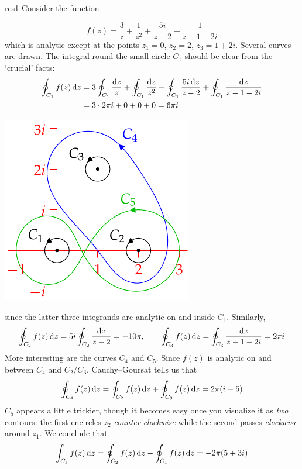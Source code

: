 \begin{example}{}{res1}
Consider the function\par
\begin{minipage}[t]{0.67\linewidth}\vspace{-10pt}
\[f(z)=\frac 3{z}+\frac 1{z^2}+\frac{5i}{z-2}+\frac 1{z-1-2i}\]
which is analytic except at the points $z_1=0$, $z_2=2$, $z_3=1+2i$.\smallbreak
Several curves are drawn. The integral round the small circle $C_1$ should be clear from the `crucial' facts:
\begin{align*}
\oint_{C_1}f(z)\,{\mathrm{d} z}&=3\oint_{C_1}\frac{{\mathrm{d} z}}z+\oint_{C_1}\frac{{\mathrm{d} z}}{z^2}+\oint_{C_1}\frac{5i\,{\mathrm{d} z}}{z-2}+\oint_{C_1}\frac{{\mathrm{d} z}}{z-1-2i}\\
&=3\cdot 2\pi i+0+0+0 =6\pi i
\end{align*}
\end{minipage}\begin{minipage}[t]{0.33\linewidth}\vspace{-15pt}
\flushright\includegraphics{res1}
\end{minipage}\medbreak
since the latter three integrands are analytic on and inside $C_1$. Similarly,
\begin{gather*}
\oint_{C_2}f(z)\,{\mathrm{d} z}=5i\oint_{C_2}\frac{{\mathrm{d} z}}{z-2}=-10\pi,\qquad
\oint_{C_3}f(z)\,{\mathrm{d} z} = \oint_{C_3}\frac{{\mathrm{d} z}}{z-1-2i}=2\pi i
\end{gather*}
More interesting are the curves $C_4$ and $C_5$. Since $f(z)$ is analytic on and between $C_4$ and $C_2/C_3$, Cauchy--Goursat tells us that
\[\oint_{C_4}f(z)\,{\mathrm{d} z}=\oint_{C_2}f(z)\,{\mathrm{d} z}+\oint_{C_3}f(z)\,{\mathrm{d} z}=2\pi(i-5)\]
$C_5$ appears a little trickier, though it becomes easy once you visualize it as \emph{two} contours: the first encircles $z_2$ \emph{counter-clockwise} while the second passes \emph{clockwise} around $z_1$. We conclude that
\[\int_{C_5}f(z)\,{\mathrm{d} z}=\oint_{C_2}f(z)\,{\mathrm{d} z}-\oint_{C_1}f(z)\,{\mathrm{d} z}=-2\pi(5+3i)\]
\end{example}

